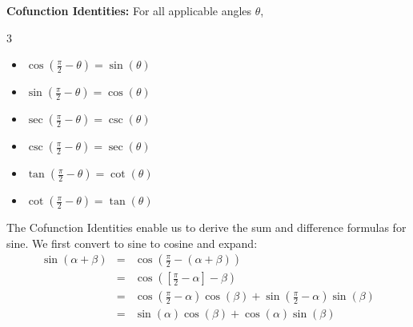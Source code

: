 \documentclass{ximera}
\begin{document}
\medskip


\begin{theorem} \label{cofunctionidentities}  \textbf{Cofunction Identities:} For all applicable angles $\theta$, 

\begin{multicols}{3}

\begin{itemize}

\item  $\cos\left( \frac{\pi}{2} - \theta \right) = \sin(\theta)$

\item  $\sin\left( \frac{\pi}{2} - \theta \right) = \cos(\theta)$

\item  $\sec\left( \frac{\pi}{2} - \theta \right) = \csc(\theta)$

\item  $\csc\left( \frac{\pi}{2} - \theta \right) = \sec(\theta)$

\item  $\tan\left( \frac{\pi}{2} - \theta \right) = \cot(\theta)$

\item  $\cot\left( \frac{\pi}{2} - \theta \right) = \tan(\theta)$

\end{itemize}

\end{multicols}

\end{theorem}

\vspace{.01in}


\medskip

The Cofunction Identities enable us to derive the sum and difference formulas for sine.  We first convert to sine to cosine and expand:
\[ \begin{array}{rcl}

\sin(\alpha + \beta) & = & \cos\left(  \frac{\pi}{2} - (\alpha + \beta) \right) \\  
                     & = & \cos\left( \left[ \frac{\pi}{2} - \alpha \right] - \beta \right) \\  
                     & = & \cos\left( \frac{\pi}{2} - \alpha \right) \cos(\beta) + \sin\left( \frac{\pi}{2} - \alpha \right)\sin(\beta) \\  
                     & = & \sin(\alpha) \cos(\beta) + \cos(\alpha) \sin(\beta) \\ \end{array} \]
\end{document}
